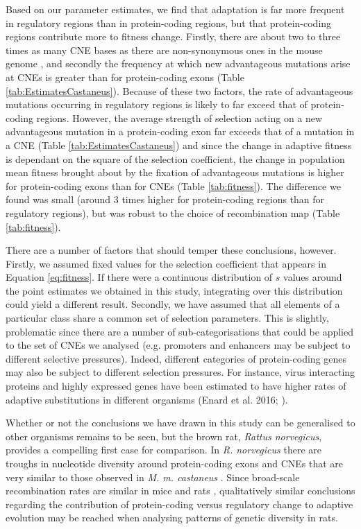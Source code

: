 {	Based on our parameter estimates, we find that adaptation is far more frequent in regulatory regions than in protein-coding regions, but that protein-coding regions contribute more to fitness change. Firstly, there are about two to three times as many CNE bases as there are non-synonymous ones in the mouse genome \citep{RN122}, and secondly the frequency at which new advantageous mutations arise at CNEs is greater than for protein-coding exons (Table \ref{tab:EstimatesCastaneus}). Because of these two factors, the rate of advantageous mutations occurring in regulatory regions is likely to far exceed that of protein-coding regions. However, the average strength of selection acting on a new advantageous mutation in a protein-coding exon far exceeds that of a mutation in a CNE (Table \ref{tab:EstimatesCastaneus}) and since the change in adaptive fitness is dependant on the square of the selection coefficient, the change in population mean fitness brought about by the fixation of advantageous mutations is higher for protein-coding exons than for CNEs (Table \ref{tab:fitness}). The difference we found was small (around 3 times higher for protein-coding regions than for regulatory regions), but was robust to the choice of recombination map (Table \ref{tab:fitness}). 

\linespread{1}

\linespread{2}

	There are a number of factors that should temper these conclusions, however. 	Firstly, we assumed fixed values for the selection coefficient that appears in Equation \ref{eq:fitness}. If there were a continuous distribution of $s$ values around the point estimates we obtained in this study, integrating over this distribution could yield a different result. Secondly, we have assumed that all elements of a particular class share a common set of selection parameters. This is slightly, problematic since there are a number of sub-categorisations that could be applied to the set of CNEs we analysed (e.g. promoters and enhancers may be subject to different selective pressures). Indeed, different categories of protein-coding genes may also be subject to different selection pressures. For instance, virus interacting proteins and highly expressed genes have been estimated to have higher rates of adaptive substitutions in different organisms (Enard  et al. 2016; \citealt{RN236}).

	Whether or not the conclusions we have drawn in this study can be generalised to other organisms remains to be seen, but the brown rat, \textit{Rattus norvegicus}, provides a compelling first case for comparison. In \textit{R. norvegicus} there are troughs in nucleotide diversity around protein-coding exons and CNEs that are very similar to those observed in \textit{M. m. castaneus} \citep{RN327}. Since broad-scale recombination rates are similar in mice and rats \citep{RN184}, qualitatively similar conclusions regarding the contribution of protein-coding versus regulatory change to adaptive evolution may be reached when analysing patterns of genetic diversity in rats. 

}
